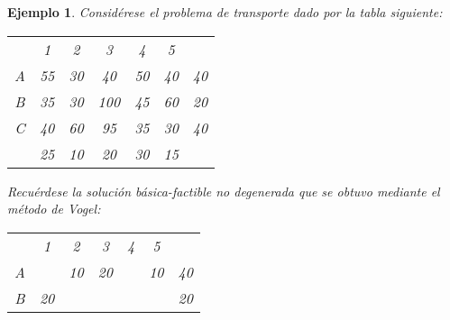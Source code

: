 \documentclass[11pt]{report}
\theoremstyle{mytheorem}
\theoremstyle{mydefinition}
\theoremstyle{myexample}
\newtheorem*{example}{Ejemplo}
\begin{document}
\begin{example}
Considérese el problema de transporte dado por la tabla siguiente:
\begin{center}
\setlength\extrarowheight{2pt}
\begin{tabular}{ccccccc}
    \multicolumn{1}{c}{} & \multicolumn{1}{c}{1} & \multicolumn{1}{c}{2} & \multicolumn{1}{c}{3} & \multicolumn{1}{c}{4} & \multicolumn{1}{c}{5} & \multicolumn{1}{c}{} \\ \cline{2-6}

    \multicolumn{1}{c|}{A} & \multicolumn{1}{c}{55} & \multicolumn{1}{c}{30} & \multicolumn{1}{c}{40} &  \multicolumn{1}{c}{50} & \multicolumn{1}{c|}{40} & \multicolumn{1}{c}{40} \\

    \multicolumn{1}{c|}{B} & \multicolumn{1}{c}{35} & \multicolumn{1}{c}{30} & \multicolumn{1}{c}{100} &  \multicolumn{1}{c}{45} & \multicolumn{1}{c|}{60} & \multicolumn{1}{c}{20} \\
    
    \multicolumn{1}{c|}{C} & \multicolumn{1}{c}{40} & \multicolumn{1}{c}{60} & \multicolumn{1}{c}{95} &  \multicolumn{1}{c}{35} & \multicolumn{1}{c|}{30} & \multicolumn{1}{c}{40} \\[2pt] \cline{2-6}

    \multicolumn{1}{c}{} & \multicolumn{1}{c}{25} & \multicolumn{1}{c}{10} & \multicolumn{1}{c}{20} & \multicolumn{1}{c}{30} & \multicolumn{1}{c}{15} & \multicolumn{1}{c}{} \\
\end{tabular}
\end{center}
Recuérdese la solución básica-factible no degenerada que se obtuvo mediante el método de Vogel:
\begin{center}
\setlength\extrarowheight{2pt}
\begin{tabular}{ccccccc}
    \multicolumn{1}{c}{} & \multicolumn{1}{c}{1} & \multicolumn{1}{c}{2} & \multicolumn{1}{c}{3} & \multicolumn{1}{c}{4} & \multicolumn{1}{c}{5} & \multicolumn{1}{c}{} \\ \cline{2-6}

    \multicolumn{1}{c|}{A} & \multicolumn{1}{c}{} & \multicolumn{1}{c}{10} & \multicolumn{1}{c}{20} &  \multicolumn{1}{c}{} & \multicolumn{1}{c|}{10} & \multicolumn{1}{c}{40} \\

    \multicolumn{1}{c|}{B} & \multicolumn{1}{c}{20} & \multicolumn{1}{c}{} & \multicolumn{1}{c}{} &  \multicolumn{1}{c}{} & \multicolumn{1}{c|}{} & \multicolumn{1}{c}{20} \\
    

\end{tabular}
\end{center}
\end{example}
\end{document}
